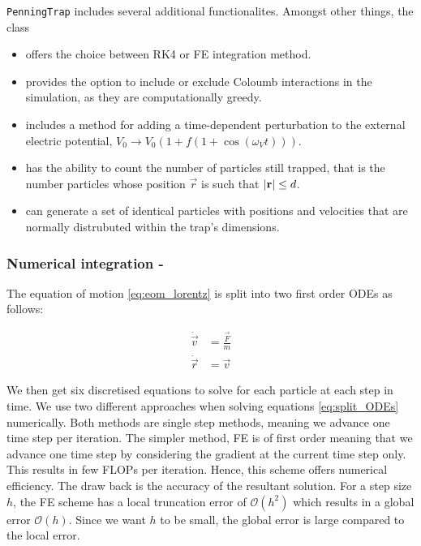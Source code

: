 
\texttt{PenningTrap} includes several additional functionalites. Amongst other things, the class

\begin{itemize}
    \item offers the choice between RK4 or FE integration method.
    \item provides the option to include or exclude Coloumb interactions in the simulation, as they are computationally greedy.
    \item includes a method for adding a time-dependent perturbation to the external electric potential, $V_0\rightarrow V_0 (1+ f(1+\cos{(\omega_V t)}))$.
    \item has the ability to count the number of particles still trapped, that is the number particles whose position $\vec{r}$ is such that $\abs{\mathbf{r}} \leq d$.
    \item can generate a set of identical particles with positions and velocities that are normally distrubuted within the trap's dimensions.
\end{itemize}

\subsubsection*{Numerical integration - }
The equation of motion \eqref{eq:eom_lorentz} is split into two first order ODEs as follows:

\begin{equation}\label{eq:split_ODEs}
    \begin{split}
        \dot{\vec{v}} &= \frac{\vec{F}}{m} \\
        \dot{\vec{r}} &= \vec{v}
    \end{split}
\end{equation}

We then get six discretised equations to solve for each particle at each step in time. We use two different approaches when solving equations \ref{eq:split_ODEs} numerically. Both methods are single step methods, meaning we advance one time step per iteration. The simpler method, FE \citep{Atkinson1989} is of first order meaning that we advance one time step by considering the gradient at the current time step only. This results in few FLOPs per iteration. Hence, this scheme offers numerical efficiency. The draw back is the accuracy of the resultant solution. For a step size $h$, the FE scheme has a local truncation error of $\mathcal{O}(h^2)$ which results in a global error $\mathcal{O}(h)$. Since we want $h$ to be small, the global error is large compared to the local error.  

